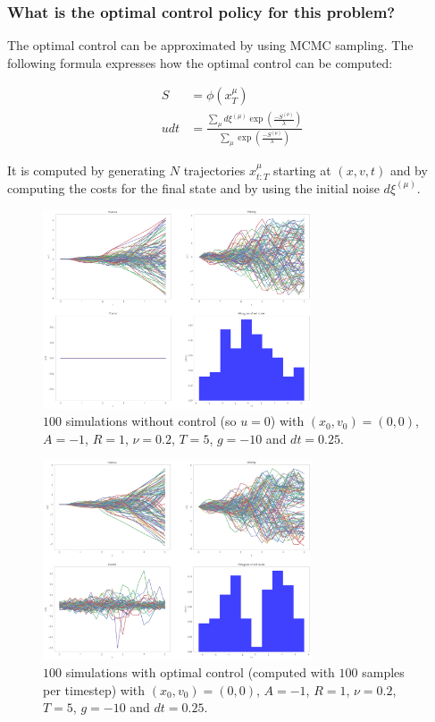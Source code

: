 \documentclass[10pt,a4paper]{article}
\begin{document}
\subsubsection{What is the optimal control policy for this problem?}
The optimal control can be approximated by using MCMC sampling. The following formula expresses how the optimal control can be computed:

\begin{align}
S &= \phi(x_T^\mu)\\
udt &= \frac{\sum\limits_\mu d \xi^{(\mu)} \exp(\frac{-S^{(\mu)}}{\lambda})}{\sum\limits_\mu \exp(\frac{-S^{(\mu)}}{\lambda})}
\end{align}

It is computed by generating $N$ trajectories $x_{t:T}^\mu$ starting at $(x, v, t)$ and by computing the costs for the final state and by using the initial noise $d\xi^{(\mu)}$.

\begin{figure}[h]
\centering
\includegraphics[width=300px]{f1.png}
\caption{$100$ simulations without control (so $u=0$) with $(x_0, v_0) = (0, 0)$, $A=-1$, $R=1$, $\nu=0.2$, $T=5$, $g=-10$ and $dt=0.25$.}
\label{fig:mcp-f1}
\end{figure}

\begin{figure}[h]
\centering
\includegraphics[width=300px]{f2.png}
\caption{$100$ simulations with optimal control (computed with $100$ samples per timestep) with $(x_0, v_0) = (0, 0)$, $A=-1$, $R=1$, $\nu=0.2$, $T=5$, $g=-10$ and $dt=0.25$.}
\label{fig:mcp-f2}
\end{figure}
\end{document}

